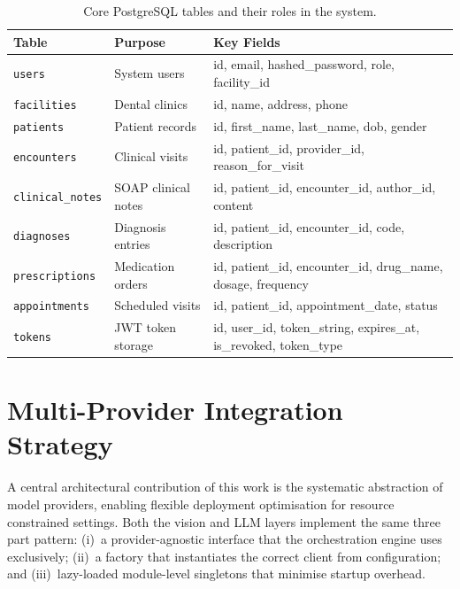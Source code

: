 \documentclass[12pt,a4paper]{report}
\begin{document}
	\begin{table}[H]
		\centering
		\caption{Core PostgreSQL tables and their roles in the system.}
		\label{tab:db_schema}
		{\small
			\begin{tabular}{p{3.5cm}p{3.2cm}p{5.5cm}}
				\toprule
				\textbf{Table} & \textbf{Purpose} & \textbf{Key Fields} \\
				\midrule
				\texttt{users}           & System users             & id, email, hashed\_password, role, facility\_id \\
				\texttt{facilities}      & Dental clinics           & id, name, address, phone \\
				\texttt{patients}        & Patient records          & id, first\_name, last\_name, dob, gender \\
				\texttt{encounters}      & Clinical visits          & id, patient\_id, provider\_id, reason\_for\_visit \\
				\texttt{clinical\_notes} & SOAP clinical notes      & id, patient\_id, encounter\_id, author\_id, content \\
				\texttt{diagnoses}       & Diagnosis entries        & id, patient\_id, encounter\_id, code, description \\
				\texttt{prescriptions}   & Medication orders   &id, patient\_id, encounter\_id, drug\_name, dosage, frequency \\
				\texttt{appointments}    & Scheduled visits         & id, patient\_id, appointment\_date, status \\
				\texttt{tokens}          & JWT token storage        & id, user\_id, token\_string, expires\_at, is\_revoked, token\_type \\
				\bottomrule
			\end{tabular}
		}
	\end{table}
	
	\section{Multi-Provider Integration Strategy}
	\label{sec:multi_provider}
	
	A central architectural contribution of this work is the systematic abstraction of model
	providers, enabling flexible deployment optimisation for resource constrained settings.
	Both the vision and LLM layers implement the same three part pattern: (i)~a
	provider-agnostic interface that the orchestration engine uses exclusively; (ii)~a factory
	that instantiates the correct client from configuration; and (iii)~lazy-loaded module-level
	singletons that minimise startup overhead.
	
\end{document}
